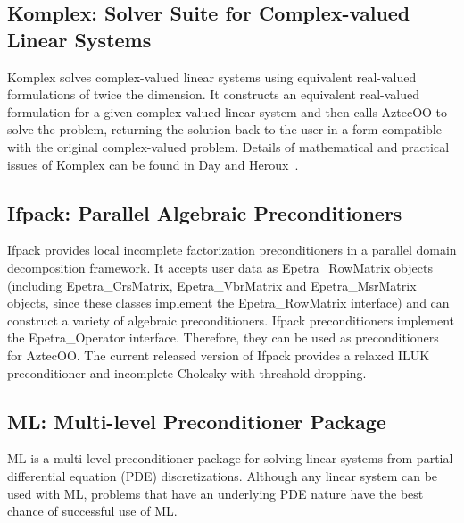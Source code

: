 \documentclass[12pt,relax]{TPA}
\begin{document}
\subsection{Komplex: Solver Suite for Complex-valued Linear Systems}

Komplex solves complex-valued linear systems using equivalent 
real-valued formulations of twice the dimension.  It constructs an 
equivalent real-valued formulation for a given complex-valued linear 
system and then calls AztecOO to solve the problem, returning the 
solution back to the user in a form compatible with the original 
complex-valued problem.  Details of mathematical and practical 
issues of Komplex can be found in Day and Heroux~\cite{DayHero2001}.

\subsection{Ifpack: Parallel Algebraic Preconditioners}

Ifpack provides local incomplete factorization preconditioners in a
parallel domain decomposition framework.  It accepts user data as 
Epetra\_RowMatrix objects (including Epetra\_CrsMatrix, 
Epetra\_VbrMatrix and Epetra\_MsrMatrix objects, since these
classes implement the Epetra\_RowMatrix interface)
and can construct a variety of algebraic preconditioners.  Ifpack 
preconditioners implement the Epetra\_Operator interface.  Therefore, 
they can be used as preconditioners for AztecOO.  The current 
released version of Ifpack provides a relaxed ILUK preconditioner and
incomplete Cholesky with threshold dropping.

\subsection{ML: Multi-level Preconditioner Package}

ML is a multi-level preconditioner package for
solving linear systems
from partial differential equation (PDE) discretizations.
Although any linear system can be used with ML,
problems that have an underlying PDE nature have the best chance of successful
use of ML.
\end{document}
